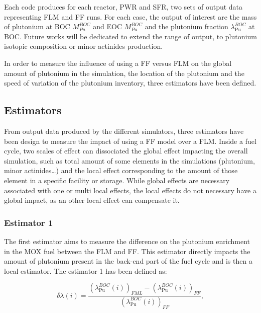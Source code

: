 Each code produces for each reactor, \gls{PWR} and \gls{SFR}, two sets of output
data representing \gls{FLM} and \gls{FF} runs. For each case, the output of
interest are the mass of plutonium at \gls{BOC} $M_{Pu}^{BOC}$ and \gls{EOC}
$M_{Pu}^{BOC}$ and the plutonium fraction $\lambda_{\mathrm{Pu}}^{BOC}$ at
\gls{BOC}. Future works will be dedicated to extend the range of output, to
plutonium isotopic composition or minor actinides production. 

In order to measure the influence of using a \gls{FF} versus \gls{FLM} on the
global amount of plutonium in the simulation, the location of the plutonium and
the speed of variation of the plutonium inventory, three estimators have been
defined.


\subsection{Estimators\label{subsec:estimator}}

From output data produced by the different simulators, three estimators have
been design to measure the impact of using a \gls{FF} model over a \gls{FLM}.
Inside a fuel cycle, two scales of effect can dissociated the global effect impacting
the overall simulation, such as total amount of some elements in the simulations
(plutonium, minor actinides\ldots) and the local effect corresponding to the
amount of those element in a specific facility or storage. While global effects
are necessary associated with one or multi local effects, the local effects do
not necessary have a global impact, as an other local effect can compensate it.


\subsubsection{Estimator 1}

The first estimator aims to measure the difference on the plutonium enrichment
in the \gls{MOX} fuel between the \gls{FLM} and \gls{FF}. This estimator directly
impacts the amount of plutonium present in the back-end part of the fuel cycle
and is then a local estimator. The estimator 1 has been defined as:

\begin{equation}
    \delta{\lambda}(i) =
        \frac{\left(\lambda_{\mathrm{Pu}}^{BOC}(i)\right)_{FML}
              - \left(\lambda_{\mathrm{Pu}}^{BOC}(i)\right)_{FF}}
              {\left(\lambda_{\mathrm{Pu}}^{BOC}(i)\right)_{FF}},
\end{equation}

